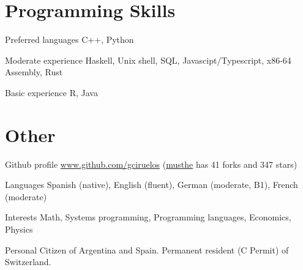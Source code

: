 \documentclass[a4paper,english,10pt]{article}
\begin{document}
\section{Programming Skills}
\begin{CV}
\item[Preferred languages] \hspace{1.2em} C++, Python
\item[Moderate experience] \hspace{0.7em} Haskell, Unix shell, SQL, Javascipt/Typescript, x86-64 Assembly, Rust
\item[Basic experience]  \hspace{2.4em} R, Java
\end{CV}


\section{Other}
\begin{CV}
\item[Github profile] \href{http://www.github.com/gciruelos}{www.github.com/gciruelos} (\href{https://github.com/gciruelos/musthe}{musthe} has 41 forks and 347 stars)
\item[Languages] Spanish (native), English (fluent), German (moderate, B1), French (moderate)
\item[Interests] Math, Systems programming, Programming languages, Economics, Physics
\item[Personal] Citizen of Argentina and Spain. Permanent resident (C Permit) of Switzerland.
\end{CV}
\end{document}
